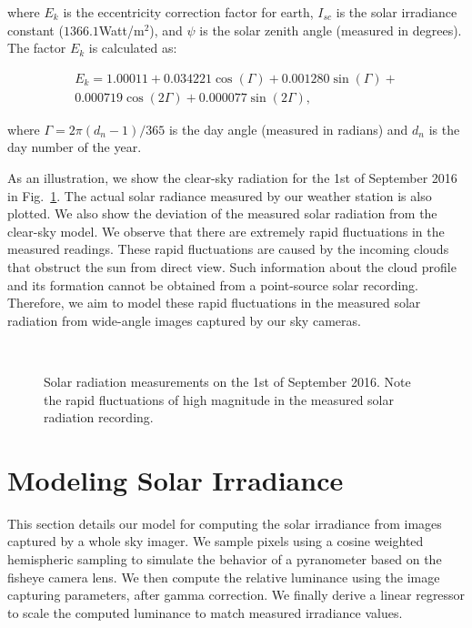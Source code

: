 where $E_k$ is the eccentricity correction factor for earth, $I_{sc}$ is the solar irradiance constant ($1366.1$Watt/$\mbox{m}^2$), and $\psi$ is the solar zenith angle (measured in degrees). The factor $E_k$ is calculated as:

\begin{equation*}
\begin{aligned}
\label{eq:E0value}
E_k = 1.00011 + 0.034221\cos(\Gamma) + 0.001280\sin(\Gamma) + \\0.000719\cos(2\Gamma) + 0.000077\sin(2\Gamma),
\end{aligned}
\end{equation*}

where $\Gamma = 2\pi(d_n-1)/365$ is the day angle (measured in radians) and $d_n$ is the day number of the year. 

As an illustration, we show the clear-sky radiation for the 1st of September 2016 in Fig.~\ref{fig:Cos_response}. The actual solar radiance measured by our weather station is also plotted. We also show the deviation of the measured solar radiation from the clear-sky model. We observe that there are extremely rapid fluctuations in the measured readings. These rapid fluctuations are caused by the incoming clouds that obstruct the sun from direct view. Such information about the cloud profile and its formation cannot be obtained from a point-source solar recording. Therefore, we aim to model these rapid fluctuations in the measured solar radiation from wide-angle images captured by our sky cameras.

\begin{figure}[htb]
\centering
{}\\ 
\caption[Measured solar radiation, and its deviation from the clear-sky model over a day.]{Solar radiation measurements on the 1st of September 2016. Note the rapid fluctuations of high magnitude in the measured solar radiation recording.}
\label{fig:Cos_response}
\end{figure}

\section{Modeling Solar Irradiance}
\label{sec:model-solar}
This section details our model for computing the solar irradiance from images captured by a whole sky imager. We sample pixels using a cosine weighted hemispheric sampling to simulate the behavior of a pyranometer based on the fisheye camera lens. We then compute the relative luminance using the image capturing parameters, after gamma correction. We finally derive a linear regressor to scale the computed luminance to match measured irradiance values.

